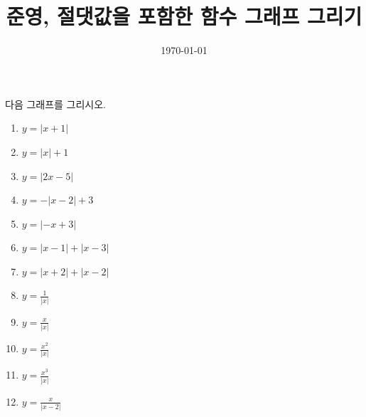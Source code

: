 \documentclass[a4paper]{oblivoir}
\title{준영, 절댓값을 포함한 함수 그래프 그리기}
\date{\today}
\author{}
\newcounter{num}
\begin{document}
\maketitle

다음 그래프를 그리시오.
\begin{enumerate}[(1)]
\item
\(y=|x+1|\)
\item
\(y=|x|+1\)
\item
\(y=|2x-5|\)
\item
\(y=-|x-2|+3\)
\item
\(y=|-x+3|\)
\item
\(y=|x-1|+|x-3|\)
\item
\(y=|x+2|+|x-2|\)
\item
\(y=\frac1{|x|}\)
\item
\(y=\frac{x}{|x|}\)
\item
\(y=\frac{x^2}{|x|}\)
\item
\(y=\frac{x^3}{|x|}\)
\item
\(y=\frac{x}{|x-2|}\)
\end{enumerate}
\clearpage
\end{document}
